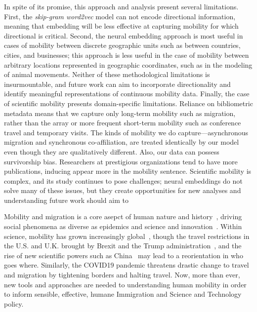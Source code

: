 \documentclass[12pt]{article} %
\begin{document}
In spite of its promise, this approach and analysis present several limitations. 
First, the \textit{skip-gram word2vec} model can not encode directional information, meaning that embedding will be less effective at capturing mobility for which directional is critical.
Second, the neural embedding approach is most useful in cases of mobility between discrete geographic units such as between countries, cities, and businesses; this approach is less useful in the case of mobility between arbitrary locations represented in geographic coordinates, such as in the modeling of animal movements. 
Neither of these methodological limitations is insurmountable, and future work can aim to incorporate directionality and identify meaningful representations of continuous mobility data. 
Finally, the case of scientific mobility presents domain-specific limitations. 
Reliance on bibliometric metadata means that we capture only long-term mobility such as migration, rather than the array or more frequent short-term mobility such as conference travel and temporary visits. 
The kinds of mobility we do capture—asynchronous migration and synchronous co-affiliation, are treated identically by our model even though they are qualitatively different.
Also, our data can possess survivorship bias. Researchers at prestigious organizations tend to have more publications, inducing appear more in the mobility sentence.
Scientific mobility is complex, and its study continues to pose challenges; neural embeddings do not solve many of these issues, but they create opportunities for new analyses and understanding
future work should aim to 



Mobility and migration is a core asepct of human nature and history~\autocite{shah2020migration}, driving social phenomena as diverse as epidemics\autocite{kraemer2020covid, truscott2012epidemicgravity, xia2005measlesgravity} and science and innovation~\autocite{kaiser2018innovation, armano2017innovation, sugimoto2017mostimpact, petersen2018multiscale, franzoni2014advantage, morgan2018prestige, rodrigues2016mobility}. 
Within science, mobility has grown increasingly global~\autocite{czaika2018globalisation}, though the travel restrictions in the U.S. and U.K. brought by Brexit and the Trump administration~\autocite{chinchilla2018travelban}, and the rise of new scientific powers such as China~\autocite{tollefson2018china, cao2020returning} may lead to a reorientation in who goes where.  
Similarly, the COVID19 pandemic threatens drastic change to travel and migration by tightening borders and halting travel. 
Now, more than ever, new tools and approaches are needed to understanding human mobility in order to inform sensible, effective, humane Immigration and Science and Technology policy.
\end{document}
